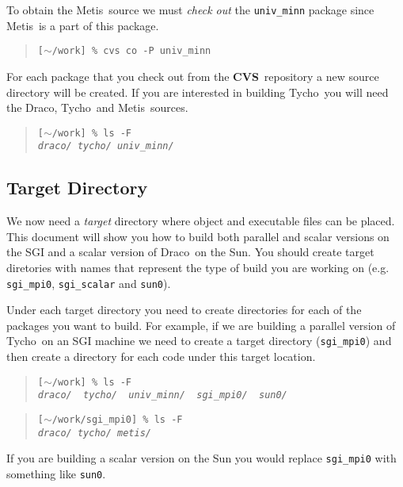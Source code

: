 \documentclass[10pt]{nmemo}
\newcommand{\comp}[1]{\normalfont\normalsize\texttt{#1}}
\newcommand{\draco}{{\normalfont\sffamily Draco}}
\newcommand{\tycho}{{\normalfont\sffamily Tycho}}
\newcommand{\metis}{{\normalfont\sffamily Metis}}
\newcommand{\cvs}{{\normalfont\bfseries CVS}}
\begin{document}
To obtain the \metis\ source we must \emph{check out} the
\comp{univ\_minn} package since \metis\ is a part of this package.

\footnotesize
\begin{verse}
\texttt{[$\sim$/work] \% cvs co -P univ\_minn}
\end{verse}
\normalsize

For each package that you check out from the \cvs\ repository a new
source directory will be created.  If you are interested in building
\tycho\ you will need the \draco, \tycho\ and \metis\ sources.

\footnotesize
\begin{verse}
\texttt{[$\sim$/work] \% ls -F \\
\emph{draco/  tycho/  univ\_minn/}}
\end{verse}
\normalsize

\subsection{Target Directory}

We now need a \emph{target} directory where object and executable
files can be placed.  This document will show you how to build both
parallel and scalar versions on the SGI and a scalar version of
\draco\ on the Sun.  You should create target diretories with names
that represent the type of build you are working on
(e.g. \comp{sgi\_mpi0}, \comp{sgi\_scalar} and \comp{sun0}).

Under each target directory you need to create directories for each of
the packages you want to build.  For example, if we are building a
parallel version of \tycho\ on an SGI machine we need to create a
target directory (\comp{sgi\_mpi0}) and then create a directory for
each code under this target location.

\footnotesize
\begin{verse}
\texttt{[$\sim$/work] \% ls -F \\
\emph{draco/\ \ tycho/\ \ univ\_minn/\ \ sgi\_mpi0/\ \ sun0/ }}
\end{verse}

\begin{verse}
\texttt{[$\sim$/work/sgi\_mpi0] \% ls -F \\
\emph{draco/  tycho/  metis/}}
\end{verse}
\normalsize

If you are building a scalar version on the Sun you would replace
\comp{sgi\_mpi0} with something like \comp{sun0}.
\end{document}
